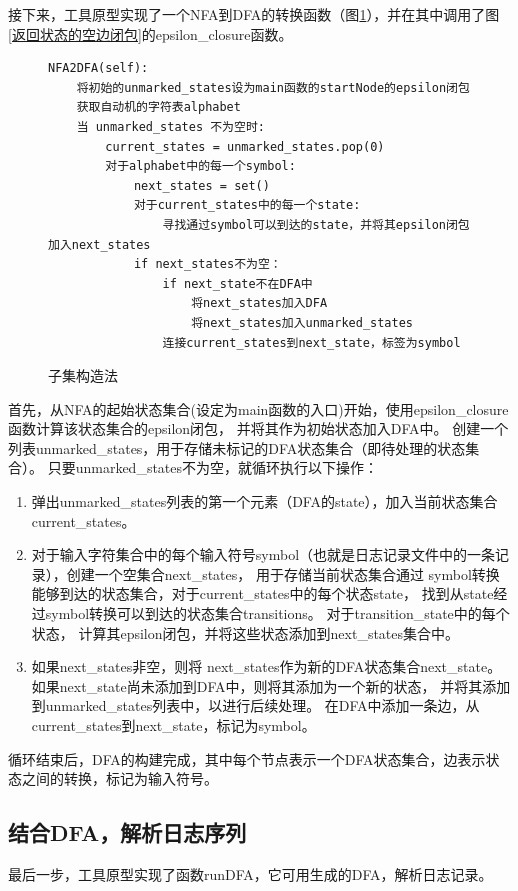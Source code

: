 接下来，工具原型实现了一个NFA到DFA的转换函数（图\ref{子集构造法}），并在其中调用了图\ref{返回状态的空边闭包}的epsilon\_closure函数。

 \begin{figure}[htbp]
	\centering
\begin{minipage}{16cm}
\begin{lstlisting}
NFA2DFA(self):
    将初始的unmarked_states设为main函数的startNode的epsilon闭包
    获取自动机的字符表alphabet
    当 unmarked_states 不为空时:
        current_states = unmarked_states.pop(0)
        对于alphabet中的每一个symbol:
            next_states = set()
            对于current_states中的每一个state:
                寻找通过symbol可以到达的state，并将其epsilon闭包加入next_states
            if next_states不为空：
                if next_state不在DFA中
                    将next_states加入DFA
                    将next_states加入unmarked_states
                连接current_states到next_state，标签为symbol
\end{lstlisting}
\end{minipage}
    \caption{子集构造法}
    \label{子集构造法}
\end{figure}
首先，从NFA的起始状态集合(设定为main函数的入口)开始，使用epsilon\_closure函数计算该状态集合的epsilon闭包，
并将其作为初始状态加入DFA中。
创建一个列表unmarked\_states，用于存储未标记的DFA状态集合（即待处理的状态集合）。
只要unmarked\_states不为空，就循环执行以下操作：
\begin{enumerate}
	\item 弹出unmarked\_states列表的第一个元素（DFA的state），加入当前状态集合current\_states。
	\item  对于输入字符集合中的每个输入符号symbol（也就是日志记录文件中的一条记录），创建一个空集合next\_states，
 用于存储当前状态集合通过
 symbol转换能够到达的状态集合，对于current\_states中的每个状态state，
 找到从state经过symbol转换可以到达的状态集合transitions。
 对于transition\_state中的每个状态，
 计算其epsilon闭包，并将这些状态添加到next\_states集合中。
	\item 如果next\_states非空，则将
 next\_states作为新的DFA状态集合next\_state。
 如果next\_state尚未添加到DFA中，则将其添加为一个新的状态，
 并将其添加到unmarked\_states列表中，以进行后续处理。
 在DFA中添加一条边，从current\_states到next\_state，标记为symbol。
\end{enumerate}
循环结束后，DFA的构建完成，其中每个节点表示一个DFA状态集合，边表示状态之间的转换，标记为输入符号。
\subsection{结合DFA，解析日志序列}
最后一步，工具原型实现了函数runDFA，它可用生成的DFA，解析日志记录。

